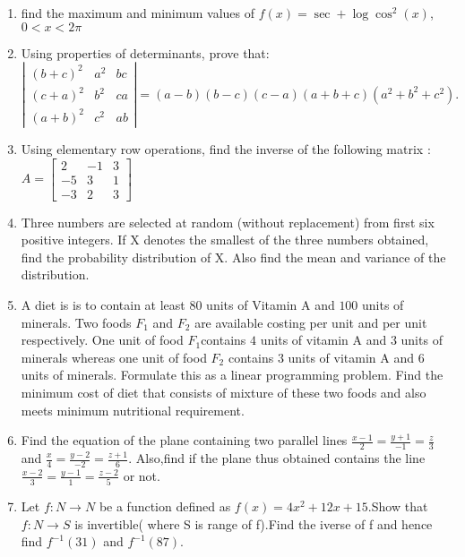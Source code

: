\documentclass[12pt,-letter paper]{article}
\providecommand{\myvec}[1]{\ensuremath{\begin{bmatrix}#1\end{bmatrix}}}
\begin{document}
\begin{enumerate}
\item find the maximum and minimum values of $f(x) =\sec+\log\cos^2(x)$,$0<x<2\pi$
\item Using properties of determinants, prove that: 
$\left| 
\begin{matrix} 
(b+c)^2 & a^2 & bc \\ 
(c+a)^2 & b^2 & ca \\ 
(a+b)^2 & c^2 & ab 
\end{matrix} 
\right| = (a-b)(b-c)(c-a)(a+b+c)(a^2+b^2+c^2).
$
\item Using elementary row operations, find the inverse of the following matrix : $A= \myvec{2&-1&3\\-5&3&1\\-3&2&3}$
\item Three numbers are selected at random (without replacement) from first six positive integers. If X denotes the smallest of the three numbers obtained, find the probability distribution of X. Also find the mean and variance of the distribution.
\item A diet is is to contain at least $80$ units of Vitamin A and $
100$ units of minerals. Two foods $F_1$ and $F_2$ are available costing  per unit and  per unit respectively. One unit of food $F_1$contains $4$ units of vitamin A and $3$ units of minerals whereas one unit of food $F_2$ contains $3$ units of vitamin A and $6$ units of minerals. Formulate this as a linear programming problem. Find the minimum cost of diet that consists of mixture of these two foods and also meets minimum nutritional requirement.
\item  Find the equation of the plane containing two parallel lines  $\frac{x-1}{2}=\frac{y+1}{-1}=\frac{z}{3}$ and $\frac{x}{4}=\frac{y-2}{-2}=\frac{z+1}{6}.$ Also,find if the plane thus obtained contains  the line $\frac{x-2}{3}=\frac{y-1}{1}=\frac{z-2}{5}$ or not.
\item Let $f : N \rightarrow N$ be a function defined as $f(x)= 4x^{   2}+12x+15$.Show that $f:N \rightarrow S$ is invertible( where S is range of f).Find the iverse of f and hence find $f^{-1}(31)$ and $f^{-1}(87)$.
\end{enumerate}
\end{document}
